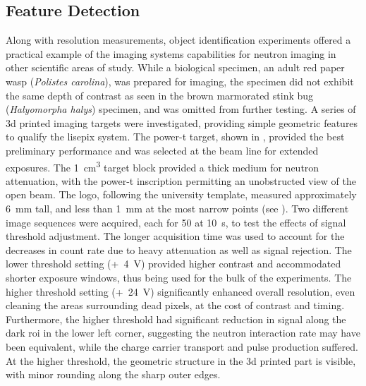 \documentclass[../../../main.tex]{subfiles}%
\begin{document}
%
    \subsection{Feature Detection}%
    \label{sec:chapter-4:semiconductor-timepix:feature-detection}%
    Along with resolution measurements, object identification experiments offered a practical example of the imaging systems capabilities for neutron imaging in other scientific areas of study.
    While a biological specimen, an adult red paper wasp (\textit{Polistes carolina}), was prepared for imaging, the specimen did not exhibit the same depth of contrast as seen in the brown marmorated stink bug (\textit{Halyomorpha halys}) specimen, and was omitted from further testing.
    A series of \gls{3d} printed imaging targets were investigated, providing simple geometric features to qualify the \gls{lisepix} system.
    The \gls{power-t} target, shown in , provided the best preliminary performance and was selected at the beam line for extended exposures.
    The \SI{1}{\centi\meter\cubed} target block provided a thick medium for neutron attenuation, with the \gls{power-t} inscription permitting an unobstructed view of the open beam.
    The logo, following the university template, measured approximately \SI{6}{\milli\meter} tall, and less than \SI{1}{\milli\meter} at the most narrow points (see ).
    Two different image sequences were acquired, each for \SI{50}{\frames} at \SI{10}{\second}, to test the effects of signal threshold adjustment.
    The longer acquisition time was used to account for the decreases in count rate due to heavy attenuation as well as signal rejection.
    The lower threshold setting (\SI{4}[+]{\volt}) provided higher contrast and accommodated shorter exposure windows, thus being used for the bulk of the experiments. 
    The higher threshold setting (\SI{24}[+]{\volt}) significantly enhanced overall resolution, even cleaning the areas surrounding dead pixels, at the cost of contrast and timing.
    Furthermore, the higher threshold had significant reduction in signal along the dark \gls{roi} in the lower left corner, suggesting the neutron interaction rate may have been equivalent, while the charge carrier transport and pulse production suffered.
    At the higher threshold, the geometric structure in the \gls{3d} printed part is visible, with minor rounding along the sharp outer edges. 
\end{document}
